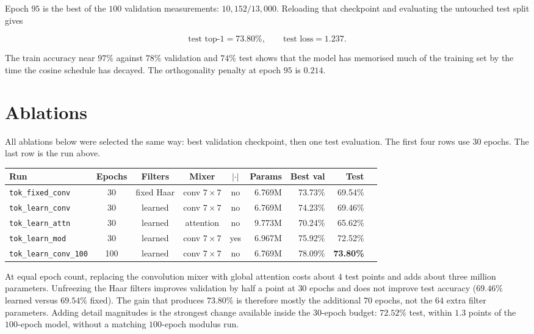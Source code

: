 \documentclass[11pt]{article}
\begin{document}
Epoch $95$ is the best of the $100$ validation measurements: $10{,}152/13{,}000$.
Reloading that checkpoint and evaluating the untouched test split gives

\begin{equation}
\text{test top-1}=73.80\%,\qquad \text{test loss}=1.237.
\end{equation}

The train accuracy near $97\%$ against $78\%$ validation and $74\%$ test shows
that the model has memorised much of the training set by the time the cosine
schedule has decayed. The orthogonality penalty at epoch $95$ is $0.214$.

\section{Ablations}

All ablations below were selected the same way: best validation checkpoint,
then one test evaluation. The first four rows use $30$ epochs. The last row is
the run above.

\begin{center}
\small
\begin{tabular}{@{}lccccrrrr@{}}
\toprule
Run & Epochs & Filters & Mixer & $|{\cdot}|$ & Params & Best val & Test \\
\midrule
\texttt{tok\_fixed\_conv} & 30 & fixed Haar & conv $7\times7$ & no & 6.769M & 73.73\% & 69.54\% \\
\texttt{tok\_learn\_conv} & 30 & learned & conv $7\times7$ & no & 6.769M & 74.23\% & 69.46\% \\
\texttt{tok\_learn\_attn} & 30 & learned & attention & no & 9.773M & 70.24\% & 65.62\% \\
\texttt{tok\_learn\_mod} & 30 & learned & conv $7\times7$ & yes & 6.967M & 75.92\% & 72.52\% \\
\texttt{tok\_learn\_conv\_100} & 100 & learned & conv $7\times7$ & no & 6.769M & 78.09\% & \textbf{73.80\%} \\
\bottomrule
\end{tabular}
\end{center}

At equal epoch count, replacing the convolution mixer with global attention
costs about $4$ test points and adds about three million parameters. Unfreezing
the Haar filters improves validation by half a point at $30$ epochs and does
not improve test accuracy ($69.46\%$ learned versus $69.54\%$ fixed). The gain
that produces $73.80\%$ is therefore mostly the additional $70$ epochs, not the
$64$ extra filter parameters. Adding detail magnitudes is the strongest change
available inside the $30$-epoch budget: $72.52\%$ test, within $1.3$ points of
the $100$-epoch model, without a matching $100$-epoch modulus run.
\end{document}

